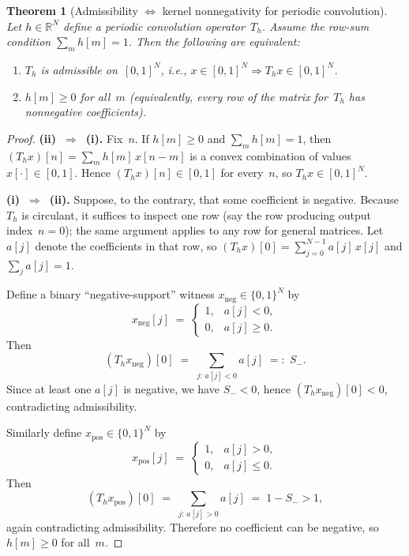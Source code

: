 \documentclass[11pt,a4paper]{article}
\theoremstyle{plain}
\newtheorem{theorem}{Theorem}[section]
\theoremstyle{definition}
\theoremstyle{plain}
\newcommand{\R}{\mathbb{R}}
\newcommand{\xneg}{x_{\mathrm{neg}}}
\newcommand{\xpos}{x_{\mathrm{pos}}}
\newcommand{\Sminus}{S_{-}}
\begin{document}
\begin{theorem}[Admissibility $\Leftrightarrow$ kernel nonnegativity for periodic convolution]
\label{thm:main}
Let $h \in \R^N$ define a periodic convolution operator~$T_h$.  Assume the
row-sum condition $\sum_{m} h[m] = 1$.  Then the following are equivalent:
\begin{enumerate}[label=(\roman*)]
  \item $T_h$ is admissible on~$[0,1]^N$, i.e.,
        $x \in [0,1]^N \Rightarrow T_h x \in [0,1]^N$.
  \item $h[m] \ge 0$ for all~$m$ (equivalently, every row of the matrix
        for~$T_h$ has nonnegative coefficients).
\end{enumerate}
\end{theorem}

\begin{proof}
\textbf{(ii)~$\Rightarrow$~(i).}\;
Fix~$n$.  If $h[m] \ge 0$ and $\sum_m h[m] = 1$, then
$(T_h x)[n] = \sum_m h[m]\,x[n-m]$ is a convex combination of values
$x[\cdot] \in [0,1]$.  Hence $(T_h x)[n] \in [0,1]$ for every~$n$, so
$T_h x \in [0,1]^N$.

\medskip\noindent
\textbf{(i)~$\Rightarrow$~(ii).}\;
Suppose, to the contrary, that some coefficient is negative.  Because~$T_h$ is
circulant, it suffices to inspect one row (say the row producing output
index~$n = 0$); the same argument applies to any row for general matrices.  Let
$a[j]$ denote the coefficients in that row, so
$(T_h x)[0] = \sum_{j=0}^{N-1} a[j]\,x[j]$ and $\sum_j a[j] = 1$.

Define a binary ``negative-support'' witness $\xneg \in \{0,1\}^N$ by
\[
  \xneg[j] \;=\;
  \begin{cases}
    1, & a[j] < 0,\\
    0, & a[j] \ge 0.
  \end{cases}
\]
Then
\[
  (T_h \xneg)[0]
  \;=\; \sum_{j:\,a[j]<0} a[j]
  \;=:\; \Sminus.
\]
Since at least one $a[j]$ is negative, we have $\Sminus < 0$, hence
$(T_h \xneg)[0] < 0$, contradicting admissibility.

Similarly define $\xpos \in \{0,1\}^N$ by
\[
  \xpos[j] \;=\;
  \begin{cases}
    1, & a[j] > 0,\\
    0, & a[j] \le 0.
  \end{cases}
\]
Then
\[
  (T_h \xpos)[0]
  \;=\; \sum_{j:\,a[j]>0} a[j]
  \;=\; 1 - \Sminus > 1,
\]
again contradicting admissibility.  Therefore no coefficient can be negative, so
$h[m] \ge 0$ for all~$m$.
\end{proof}
\end{document}
